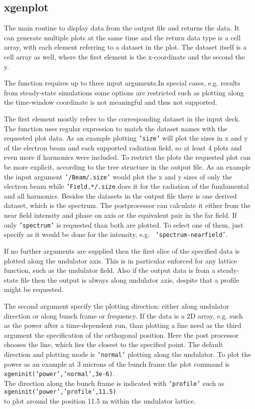 \documentclass[12pt]{book}
\begin{document}
\subsection{\sf xgenplot}

The main routine to display data from the output file and returns the data. It can generate multiple plots at the same time and the return data type is a cell array, with each element referring to a dataset in the plot. The dataset itself is a cell array as well, where the first element is the x-coordinate and the second the y.

The function requires up to three input arguments.In special cases, e.g. results from steady-state simulations some options are restricted such as plotting along the time-window coordinate is not meaningful and thus not supported.

The first element mostly refers to the corresponding dataset in the input deck. The function uses regular expression to match the dataset names with the requested plot data. As an example plotting {\tt 'size'} will plot the sizes in x and y of the electron beam and each supported radiation field, so at least 4 plots and even more if harmonics were included. To restrict the plots the requested plot can be more explicit, according to the tree structure in the output file. As an example the input argument {\tt '/Beam/.size'} would plot the x and y sizes of only the electron beam while {\tt 'Field.*/.size} does it for the radiation of the fundamental and all harmonics. Besides the datasets in the output file there is one derived dataset, which is the spectrum. The postprocessor can calculate it either from the near field intensity and phase on axis or the equivalent pair in the far field. If only {\tt 'spectrum'} is requested than both are plotted. To select one of them, just specify as it would be done for the intensity, e.g.~ {\tt 'spectrum-nearfield'}.

If no further arguments are supplied then the first slice of the specified data is plotted along the undulator axis. This is in particular enforced for any lattice function, such as the undulator field. Also if the output data is from a steady-state file then the output is always along undulator axis, despite that a profile might be requested. 

The second argument specify the plotting direction: either along undulator direction or along bunch frame or frequency. If the data is a 2D array, e.g. such as the power after a time-dependent run, than plotting a line need as the third argument the specification of the orthogonal position. Here the post processor chooses the line, which lies the closest to the specified point. The default direction and plotting mode is {\tt 'normal'} plotting along the undulator. To plot the power as an example at 3 microns of the bunch frame the plot command is \\
{\tt xgeninit('power','normal',3e-6)}.\\
The direction along the bunch frame is indicated with {\tt 'profile'} such as\\
{\tt xgeninit('power','profile',11.5)}\\
to plot around the position 11.5 m within the undulator lattice.
\end{document}
